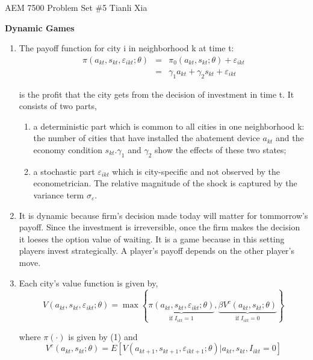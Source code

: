 \documentclass{article}
\begin{document}
\bigskip AEM 7500 Problem Set \#5 Tianli Xia

\textbf{Dynamic Games}

\begin{enumerate}
\item The payoff function for city i in neighborhood k at time t:%
\begin{eqnarray*}
\pi \left( a_{kt},s_{kt},\varepsilon _{ikt};\theta \right) &=&\pi _{0}\left(
a_{kt},s_{kt};\theta \right) +\varepsilon _{ikt} \\
&=&\gamma _{1}a_{kt}+\gamma _{2}s_{kt}+\varepsilon _{ikt}
\end{eqnarray*}

is the profit that the city gets from the decision of investment in time t.
It consists of two parts,

\begin{enumerate}
\item a deterministic part which is common to all cities in one neighborhood
k: the number of cities that have installed the abatement device $a_{kt}$
and the economy condition $s_{kt}.\gamma _{1}$ and $\gamma _{2}$ show the
effects of these two states;

\item a stochastic part $\varepsilon _{ikt}$ which is city-specific and not
observed by the econometrician. The relative magnitude of the shock is
captured by the variance term $\sigma _{\varepsilon }.$
\end{enumerate}

\item It is dynamic because firm's decision made today will matter for
tommorrow's payoff. Since the investment is irreversible, once the firm
makes the decision it loeses the option value of waiting. It is a game
because in this setting players invest strategically. A player's payoff
depends on the other player's move.

\item Each city's value function is given by,%
\begin{equation*}
V\left( a_{kt},s_{kt},\varepsilon _{ikt};\theta \right) =\max \left\{ 
\underset{\text{if }I_{ikt}=1}{\underbrace{\pi \left(
a_{kt},s_{kt},\varepsilon _{ikt};\theta \right) }},\underset{\text{if }%
I_{ikt}=0}{\underbrace{\beta V^{c}\left( a_{kt},s_{kt};\theta \right) }}%
\right\}
\end{equation*}

where $\pi \left( \cdot \right) $ is given by (1) and 
\begin{equation*}
V^{c}\left( a_{kt},s_{kt};\theta \right) =E\left[ V\left(
a_{kt+1},s_{kt+1},\varepsilon _{ikt+1};\theta \right)
|a_{kt},s_{kt},I_{ikt}=0\right]
\end{equation*}


\end{enumerate}
\end{document}
